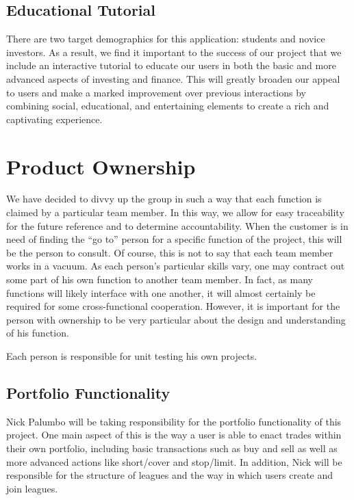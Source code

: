 \documentclass[11pt,letterpaper,oneside]{memoir}
\begin{document}
\section{Educational Tutorial}

There are two target demographics for this application: students and novice investors. As a
result, we find it important to the success of our project that we include an interactive
tutorial to educate our users in both the basic and more advanced aspects of investing
and finance. This will greatly broaden our appeal to users and make a marked improvement over
previous interactions by combining social, educational, and entertaining elements to create
a rich and captivating experience.

\chapter{Product Ownership}

We have decided to divvy up the group in such a way that each function is claimed by a
particular team member. In this way, we allow for easy traceability for the future reference
and to determine accountability. When the customer is in need of finding the ``go to'' person for
a specific function of the project, this will be the person to consult. Of course, this
is not to say that each team member works in a vacuum. As each person's particular skills vary,
one may contract out some part of his own function to another team member. In fact, as many
functions will likely interface with one another, it will almost certainly be required for some
cross-functional cooperation. However, it is important for the person with ownership to be very
particular about the design and understanding of his function.

Each person is responsible for unit testing his own projects.

\section{Portfolio Functionality}
Nick Palumbo will be taking responsibility for the portfolio functionality of this project. One main
aspect of this is the way a user is able to enact trades within their own portfolio, including basic
transactions such as buy and sell as well as more advanced actions like short/cover and stop/limit.
In addition, Nick will be responsible for the structure of leagues and the way in which users create
and join leagues.
\end{document}
